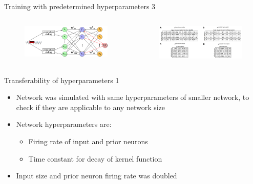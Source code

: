 \documentclass[aspectratio=169]{beamer}
\begin{document}
\begin{frame}{Training with predetermined hyperparameters 3}
 \vspace{-1.0cm}
   \begin{columns}
     \begin{column}{0.4\textwidth}
        \begin{figure}
        \includegraphics[width=1\linewidth]{../inkscape/networkPlanWeightComparison.png}
      \end{figure} 
     \end{column}
     \begin{column}{0.6\textwidth}
		\begin{figure}
        \includegraphics[width=1\linewidth]{../Latex/figures/1D/training/weightComparison.png}
      \end{figure} 
      \end{column}
    \end{columns}
\end{frame}


\begin{frame}{Transferability of hyperparameters 1}
  \begin{itemize}
      \item Network was simulated with same hyperparameters of smaller network, to check if they are applicable to any network size
      \item Network hyperparameters are:
      \begin{itemize}
        \item Firing rate of input and prior neurons
        \item Time constant for decay of kernel function
      \end{itemize}
      \item Input size and prior neuron firing rate  was doubled
  \end{itemize}
\end{frame}
\end{document}
